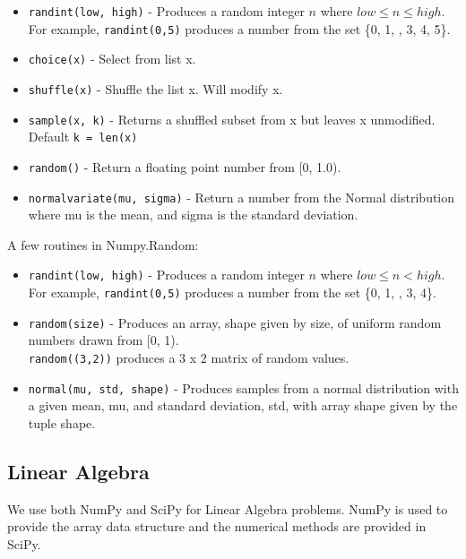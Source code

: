 \begin{itemize}
\item
  \texttt{randint(low,\ high)} - Produces a random integer \(n\) where
  \(low \leq n \leq high\).\\
  For example, \texttt{randint(0,5)} produces a number from the set \{0,
  1, , 3, 4, 5\}.
\item
  \texttt{choice(x)} - Select from list x.
\item
  \texttt{shuffle(x)} - Shuffle the list x. Will modify x.
\item
  \texttt{sample(x,\ k)} - Returns a shuffled subset from x but leaves x
  unmodified. Default \texttt{k\ =\ len(x)}
\item
  \texttt{random()} - Return a floating point number from {[}0, 1.0).
\item
  \texttt{normalvariate(mu,\ sigma)} - Return a number from the Normal
  distribution where mu is the mean, and sigma is the standard
  deviation.
\end{itemize}

A few routines in Numpy.Random:

\begin{itemize}
\item
  \texttt{randint(low,\ high)} - Produces a random integer \(n\) where
  \(low \leq n < high\).\\
  For example, \texttt{randint(0,5)} produces a number from the set \{0,
  1, , 3, 4\}.
\item
  \texttt{random(size)} - Produces an array, shape given by size, of
  uniform random numbers drawn from {[}0, 1).\\
  \texttt{random((3,2))} produces a 3 x 2 matrix of random values.
\item
  \texttt{normal(mu,\ std,\ shape)} - Produces samples from a normal
  distribution with a given mean, mu, and standard deviation, std, with
  array shape given by the tuple shape.
\end{itemize}

\hypertarget{linear-algebra}{%
\subsection{Linear Algebra}\label{linear-algebra}}

We use both NumPy and SciPy for Linear Algebra problems. NumPy is used
to provide the array data structure and the numerical methods are
provided in SciPy.

